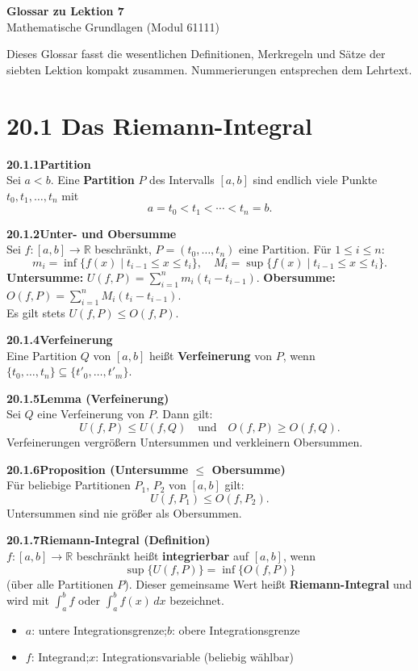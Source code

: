 \documentclass[a4paper,12pt]{article}
\newcommand{\gentry}[3]{%
  \noindent\textbf{#1\quad #2}\nopagebreak\\[0.2em]
  #3\par\smallskip
}
\begin{document}
\begin{center}
  {\LARGE\bfseries Glossar zu Lektion 7}\\[0.5em]
  {\large Mathematische Grundlagen (Modul 61111)}
\end{center}

\vspace{1em}

Dieses Glossar fasst die wesentlichen Definitionen, Merkregeln und Sätze der
siebten Lektion kompakt zusammen.
Nummerierungen entsprechen dem Lehrtext.

\section*{20.1 \quad Das Riemann-Integral}

\gentry{20.1.1}{Partition}{%
  Sei $a < b$. Eine \textbf{Partition} $P$ des Intervalls $[a,b]$ sind endlich
  viele Punkte $t_0, t_1, \ldots, t_n$ mit
  \[
    a = t_0 < t_1 < \cdots < t_n = b.
  \]
}

\gentry{20.1.2}{Unter- und Obersumme}{%
  Sei $f : [a,b] \to \mathbb{R}$ beschränkt, $P = (t_0, \ldots, t_n)$ eine Partition.
  Für $1 \le i \le n$:
  \[
    m_i = \inf\{f(x) \mid t_{i-1} \le x \le t_i\},\quad
    M_i = \sup\{f(x) \mid t_{i-1} \le x \le t_i\}.
  \]
  \textbf{Untersumme:}
  $U(f,P) = \sum_{i=1}^n m_i(t_i - t_{i-1})$.\quad
  \textbf{Obersumme:}
  $O(f,P) = \sum_{i=1}^n M_i(t_i - t_{i-1})$.\\
  Es gilt stets $U(f,P) \le O(f,P)$.
}

\gentry{20.1.4}{Verfeinerung}{%
  Eine Partition $Q$ von $[a,b]$ heißt \textbf{Verfeinerung} von $P$, wenn
  $\{t_0,\ldots,t_n\} \subseteq \{t'_0,\ldots,t'_m\}$.
}

\gentry{20.1.5}{Lemma (Verfeinerung)}{%
  Sei $Q$ eine Verfeinerung von $P$. Dann gilt:
  \[
    U(f,P) \le U(f,Q) \quad\text{und}\quad O(f,P) \ge O(f,Q).
  \]
  Verfeinerungen vergrößern Untersummen und verkleinern Obersummen.
}

\gentry{20.1.6}{Proposition (Untersumme $\le$ Obersumme)}{%
  Für beliebige Partitionen $P_1$, $P_2$ von $[a,b]$ gilt:
  \[
    U(f,P_1) \le O(f,P_2).
  \]
  Untersummen sind nie größer als Obersummen.
}

\gentry{20.1.7}{Riemann-Integral (Definition)}{%
  $f : [a,b] \to \mathbb{R}$ beschränkt heißt \textbf{integrierbar} auf $[a,b]$, wenn
  \[
    \sup\{U(f,P)\} = \inf\{O(f,P)\}
  \]
  (über alle Partitionen $P$).
  Dieser gemeinsame Wert heißt \textbf{Riemann-Integral} und wird mit
  $\displaystyle\int_a^b f$ oder $\displaystyle\int_a^b f(x)\,dx$ bezeichnet.
  \begin{itemize}[topsep=2pt,itemsep=1pt]
    \item $a$: untere Integrationsgrenze;\quad $b$: obere Integrationsgrenze
    \item $f$: Integrand;\quad $x$: Integrationsvariable (beliebig wählbar)
  \end{itemize}
}
\end{document}

